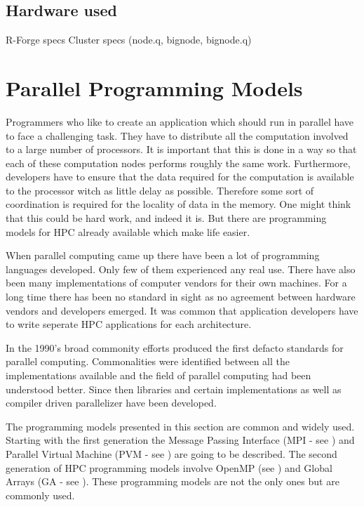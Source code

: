 \subsection{Hardware used}

R-Forge specs
Cluster specs (node.q, bignode, bignode.q)

\section{Parallel Programming Models}

Programmers who like to create an application which should run in
parallel have to face a challenging task. They have to distribute all
the computation involved to a large number of processors. It is
important that this is done in a way so that each of these computation
nodes performs roughly the same work. Furthermore, developers have to
ensure that the data required for the computation is available to the
processor witch as little delay as possible. Therefore some sort of
coordination is required for the locality of data in the memory.
One might think that this could be hard work, and indeed it is. But
there are programming models for HPC already available which make life
easier.

When parallel computing came up there have been a lot of programming
languages developed. Only few of them experienced any real use. There
have also been many implementations of computer vendors for their own
machines. For a long time there has been no standard in sight as no
agreement between hardware vendors and developers emerged. It was
common that application developers have to write seperate HPC
applications for each architecture.

In the 1990's broad commonity efforts produced the first defacto
standards for parallel computing. Commonalities were identified
between all the implementations available and the field of parallel
computing had been understood better. Since then libraries and certain
implementations as well as compiler driven parallelizer have been
developed.

The programming models presented in this section are common and widely
used. Starting with the first generation the Message Passing Interface
(MPI - see \cite{}) and Parallel Virtual Machine (PVM - see \cite{})
are going to be described. The second generation of HPC programming
models involve OpenMP (see \cite{}) and Global Arrays (GA - see
\cite{}). These programming models are not the only ones but are
commonly used. 

